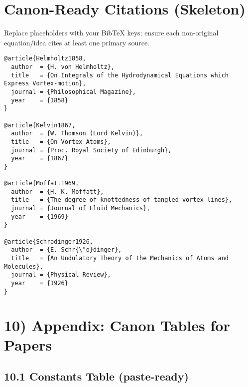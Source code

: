 \documentclass[11pt]{article}
\begin{document}
\section{Canon-Ready Citations (Skeleton)}

Replace placeholders with your BibTeX keys; ensure each non-original equation/idea cites at least one primary source.

\begin{verbatim}
@article{Helmholtz1858,
  author  = {H. von Helmholtz},
  title   = {On Integrals of the Hydrodynamical Equations which Express Vortex-motion},
  journal = {Philosophical Magazine},
  year    = {1858}
}

@article{Kelvin1867,
  author  = {W. Thomson (Lord Kelvin)},
  title   = {On Vortex Atoms},
  journal = {Proc. Royal Society of Edinburgh},
  year    = {1867}
}

@article{Moffatt1969,
  author  = {H. K. Moffatt},
  title   = {The degree of knottedness of tangled vortex lines},
  journal = {Journal of Fluid Mechanics},
  year    = {1969}
}

@article{Schrodinger1926,
  author  = {E. Schr{\"o}dinger},
  title   = {An Undulatory Theory of the Mechanics of Atoms and Molecules},
  journal = {Physical Review},
  year    = {1926}
}
\end{verbatim}

\section*{10) Appendix: Canon Tables for Papers}

\subsection*{10.1 Constants Table (paste-ready)}
\end{document}
